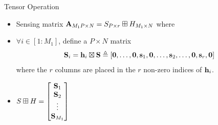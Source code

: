 \documentclass[10pt]{beamer}
\begin{document}
\begin{frame}{Tensor Operation}
\begin{itemize}
\item Sensing matrix $\mathbf{A}_{M_{1}P\times N}= S_{P\times r}\boxplus H_{M_{1}\times N}$ where
\vspace{2ex}
\item $\forall i\in [1:M_1]$, define a $P\times N$ matrix
\begin{equation*}
\mathbf{S}_i=\mathbf{h}_i \boxtimes \mathbf{S}\triangleq [\mathbf{0},\ldots,\mathbf{0},\mathbf{s}_1,\mathbf{0},\ldots,\mathbf{s}_2,\ldots,\mathbf{0},\mathbf{s}_r,\mathbf{0}]
\end{equation*}
where the $r$ columns are placed in the $r$ non-zero indices of $\mathbf{h}_i$.
\vspace{2ex}
\item $S\boxplus H=\begin{bmatrix}
\mathbf{S}_1\\
\mathbf{S}_2\\
\vdots\\
\mathbf{S}_{M_1}
\end{bmatrix}
$
\end{itemize}
\end{frame}
\end{document}
